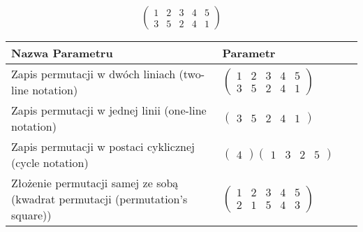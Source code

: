 \documentclass[12pt]{article}
\begin{document}
\subsection{}
\begin{center}
\[
\begin{pmatrix}
	1 & 2 & 3 & 4 & 5 \\ 
	3 & 5 & 2 & 4 & 1 
\end{pmatrix}
\]

\begin{tabular}{|m{0.6\linewidth}|m{0.4\linewidth}|}
	\hline
	Nazwa Parametru & Parametr \\
	\hline
	Zapis permutacji w dwóch liniach (two-line notation) & $\begin{pmatrix} 1 & 2 & 3 & 4 & 5 \\ 
3 & 5 & 2 & 4 & 1 \end{pmatrix}$ \\ 
	\hline
	Zapis permutacji w jednej linii (one-line notation) & $\begin{pmatrix} 3 & 5 & 2 & 4 & 1 \end{pmatrix}$ \\ 
	\hline
	Zapis permutacji w postaci cyklicznej (cycle notation) & $\begin{pmatrix} 4 \end{pmatrix} \begin{pmatrix} 1 & 3 & 2 & 5 \end{pmatrix} $ \\ 
	\hline
	Złożenie permutacji samej ze sobą (kwadrat permutacji (permutation's square)) & $\begin{pmatrix} 1 & 2 & 3 & 4 & 5 \\ 
2 & 1 & 5 & 4 & 3 \end{pmatrix}$ \\ 
	\hline
\end{tabular}
\end{center}
\end{document}
